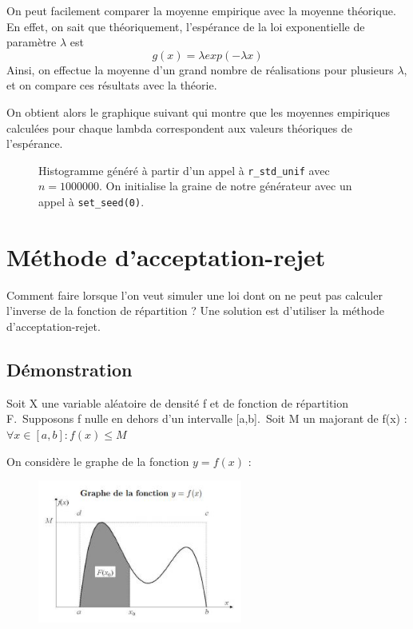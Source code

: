 \documentclass[10pt]{article} %
\begin{document}
On peut facilement comparer la moyenne empirique avec la moyenne théorique. En effet, on sait que théoriquement, l'espérance de la loi exponentielle de paramètre $\lambda$ est $$g(x)=\lambda exp(-\lambda x)$$ Ainsi, on effectue la moyenne d'un grand nombre de réalisations pour plusieurs $\lambda$,  et on compare ces résultats avec la théorie.

On obtient alors le graphique suivant qui montre que les moyennes empiriques calculées pour chaque lambda correspondent aux valeurs théoriques de l'espérance.
\begin{figure}[h!]
    \centering
    
    \vspace{-1cm}
   \caption{Histogramme généré à partir d'un appel à \texttt{r\_std\_unif} avec $n = 1000000$. On initialise la graine de notre
    générateur avec un appel à \texttt{set\_seed(0)}.}

\end{figure}






\section{Méthode d'acceptation-rejet}

Comment faire lorsque l'on veut simuler une loi dont on ne peut pas calculer l'inverse de la fonction de répartition ? Une solution est d'utiliser la méthode d'acceptation-rejet.

\subsection{Démonstration}
Soit X une variable aléatoire de densité f et de fonction de répartition F.\
Supposons f nulle en dehors d'un intervalle [a,b].\
Soit M un majorant de f(x) : $\forall x \in [a,b] : f(x) \leq M$ \

On considère le graphe de la fonction $y = f(x)$ :

\begin{figure}[h!]
    \centering
    \includegraphics[width=0.6\textwidth]{media/Graphe_fonction.jpg}

\end{figure}
\end{document}
